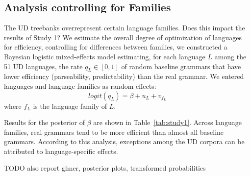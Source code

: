 \documentclass[10pt,twoside,lineno]{article}
\begin{document}
%
%
%
%
%


\subsection{Analysis controlling for Families}

The UD treebanks overrepresent certain language families.
Does this impact the results of Study 1?
We estimate the overall degree of optimization of languages for efficiency, controlling for differences between families, we constructed a Bayesian logistic mixed-effects model estimating, for each language $L$ among the 51 UD languages, the rate $q_L \in [0,1]$ of random baseline grammars that have lower efficiency (parseability, predictability) than the real grammar.
We entered languages and language families as random effects:
\begin{equation}\label{eq:mixed-effects-study1}
logit(q_{L}) = \beta + u_{L} + v_{f_L}
\end{equation}
where $f_L$ is the language family of $L$.

Results for the posterior of $\beta$ are shown in Table~\ref{tab:study1}.
Across language families, real grammars tend to be more efficient than almost all baseline grammars.
According to this analysis, exceptions among the UD corpora can be attributed to language-specific effects.

TODO also report glmer, posterior plots, transformed probabilities
\end{document}
